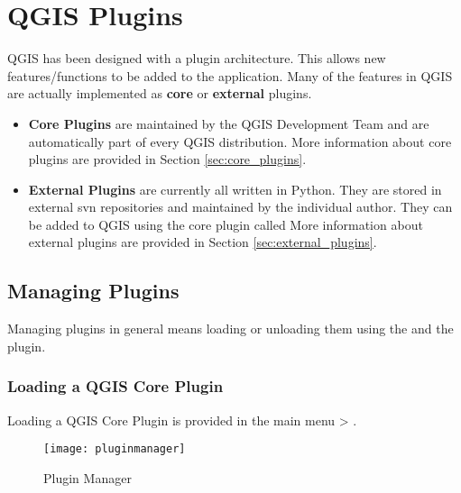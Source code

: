 \section{QGIS Plugins}

\updatedisclaimer

QGIS has been designed with a plugin architecture. This allows new 
features/functions to be added to the application. Many of the features in 
QGIS are actually implemented as \textbf{core} or \textbf{external} 
plugins. 

\begin{itemize}
\item \textbf{Core Plugins} are maintained by the QGIS Development Team and 
are automatically part of every QGIS distribution. More information about core 
plugins are provided in Section \ref{sec:core_plugins}.
\item \textbf{External Plugins} are currently all written in Python. They 
are stored in external svn repositories and maintained by the individual 
author. They can be added to QGIS using the core plugin called 
 More information about external plugins are 
provided in Section \ref{sec:external_plugins}.
\end{itemize}

\subsection{Managing Plugins}\label{sec:managing_plugins} 

Managing plugins in general means loading or unloading them using the 
 and the  plugin. 

\subsubsection{Loading a QGIS Core Plugin}\label{sec:load_core_plugin} 

Loading a QGIS Core Plugin is provided in the main menu  > 
.

\begin{figure}[ht]
   \begin{center}
   \caption{Plugin Manager \nixcaption}\label{fig:pluginmanager}\smallskip
   \texttt{[image: pluginmanager]}
\end{center}
\end{figure}

